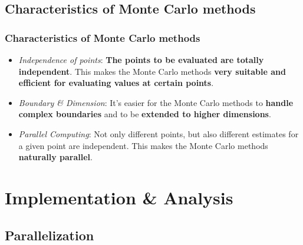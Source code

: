 \documentclass{beamer}
\begin{document}

\subsection{Characteristics of Monte Carlo methods}

\begin{frame}
\frametitle{Characteristics of Monte Carlo methods}
\begin{itemize}
\item \emph{Independence of points}: \textbf{The points to be evaluated are totally independent}. This makes the Monte Carlo methods \textbf{very suitable and efficient for evaluating values at certain points}.
\item \emph{Boundary \& Dimension}: It's easier for the Monte Carlo methods to \textbf{handle complex boundaries} and to be \textbf{extended to higher dimensions}.
\item \emph{Parallel Computing}: Not only different points, but also different estimates for a given point are independent. This makes the Monte Carlo methods \textbf{naturally parallel}.
\end{itemize}
\end{frame}


\section{Implementation \& Analysis}


\subsection{Parallelization}
\end{document}
